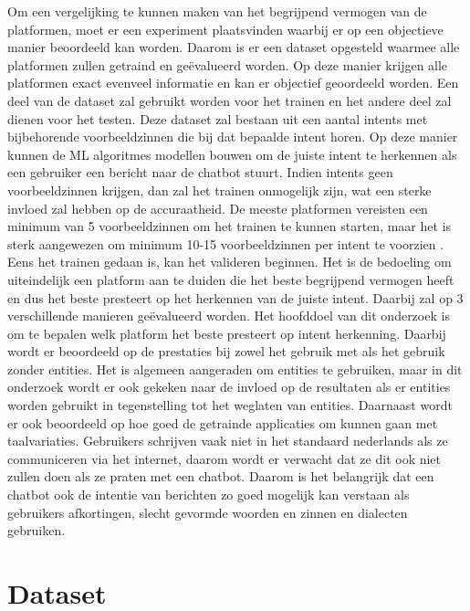 Om een vergelijking te kunnen maken van het begrijpend vermogen van de platformen, moet er een experiment plaatsvinden waarbij er op een objectieve manier beoordeeld kan worden. Daarom is er een dataset opgesteld waarmee alle platformen zullen getraind en geëvalueerd worden. Op deze manier krijgen alle platformen exact evenveel informatie en kan er objectief geoordeeld worden. Een deel van de dataset zal gebruikt worden voor het trainen en het andere deel zal dienen voor het testen. Deze dataset zal bestaan uit een aantal intents met bijbehorende voorbeeldzinnen die bij dat bepaalde intent horen. Op deze manier kunnen de ML algoritmes modellen bouwen om de juiste intent te herkennen als een gebruiker een bericht naar de chatbot stuurt. Indien intents geen voorbeeldzinnen krijgen, dan zal het trainen onmogelijk zijn, wat een sterke invloed zal hebben op de accuraatheid. De meeste platformen vereisten een minimum van 5 voorbeeldzinnen om het trainen te kunnen starten, maar het is sterk aangewezen om minimum 10-15 voorbeeldzinnen per intent te voorzien \autocite{Greyling2019}. Eens het trainen gedaan is, kan het valideren beginnen. Het is de bedoeling om uiteindelijk een platform aan te duiden die het beste begrijpend vermogen heeft en dus het beste presteert op het herkennen van de juiste intent. Daarbij zal op 3 verschillende manieren geëvalueerd worden. Het hoofddoel van dit onderzoek is om te bepalen welk platform het beste presteert op intent herkenning. Daarbij wordt er beoordeeld op de prestaties bij zowel het gebruik met als het gebruik zonder entities. Het is algemeen aangeraden om entities te gebruiken, maar in dit onderzoek wordt er ook gekeken naar de invloed op de resultaten als er entities worden gebruikt in tegenstelling tot het weglaten van entities. Daarnaast wordt er ook beoordeeld op hoe goed de getrainde applicaties om kunnen gaan met taalvariaties. Gebruikers schrijven vaak niet in het standaard nederlands als ze communiceren via het internet, daarom wordt er verwacht dat ze dit ook niet zullen doen als ze praten met een chatbot. Daarom is het belangrijk dat een chatbot ook de intentie van berichten zo goed mogelijk kan verstaan als gebruikers afkortingen, slecht gevormde woorden en zinnen en dialecten gebruiken.

\section{Dataset}
\label{sec:dataset}

